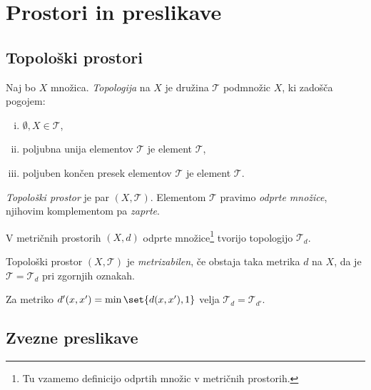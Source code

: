 \section{Prostori in preslikave}

\subsection{Topološki prostori}


\begin{okvir}
\begin{definicija}
Naj bo $X$ množica. \emph{Topologija} na $X$ je
družina $\mathcal{T}$ podmnožic $X$, ki zadošča pogojem:

\begin{enumerate}[i)]
\item $\emptyset, X \in \mathcal{T}$,
\item poljubna unija elementov $\mathcal{T}$ je element
$\mathcal{T}$,
\item poljuben končen presek elementov $\mathcal{T}$ je element
$\mathcal{T}$.
\end{enumerate}

\emph{Topološki prostor} je par
$(X,\mathcal{T})$. Elementom $\mathcal{T}$ pravimo
\emph{odprte množice},
njihovim komplementom pa \emph{zaprte}.
\end{definicija}
\end{okvir}

\begin{opomba}
V metričnih prostorih $(X,d)$ odprte množice\footnote{Tu vzamemo
definicijo odprtih množic v metričnih prostorih.} tvorijo
topologijo $\mathcal{T}_d$.
\end{opomba}

\begin{definicija}
Topološki prostor $(X,\mathcal{T})$ je
\emph{metrizabilen}, če
obstaja taka metrika $d$ na $X$, da je
$\mathcal{T} = \mathcal{T}_d$ pri zgornjih oznakah.
\end{definicija}

\begin{opomba}
Za metriko $d'(x,x') = \min \set{d(x,x'),1}$ velja
$\mathcal{T}_d = \mathcal{T}_{d'}$.
\end{opomba}

\newpage

\subsection{Zvezne preslikave}

